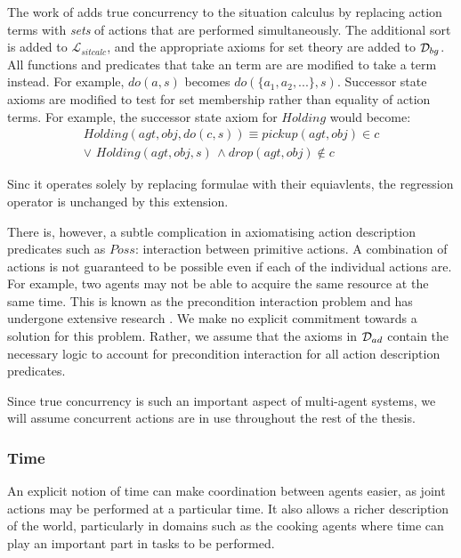The work of \citep{lin92sc_conc,reiter96sc_nat_conc} adds true concurrency
to the situation calculus by replacing action terms with \emph{sets}
of actions that are performed simultaneously. The additional sort
 is added to $\mathcal{L}_{sitcalc}$, and the appropriate
axioms for set theory are added to $\mathcal{D}_{bg}$. All functions and
predicates that take an  term are are modified to take
a  term instead. For example, $do(a,s)$ becomes
$do(\{a_{1},a_{2},...\},s)$. Successor state axioms are modified
to test for set membership rather than equality of action terms. For
example, the successor state axiom for $Holding$ would become:\begin{multline*}
Holding(agt,obj,do(c,s))\equiv pickup(agt,obj)\in c\\
\vee\,\, Holding(agt,obj,s)\,\wedge drop(agt,obj)\not\in c\end{multline*}


Sinc it operates solely by replacing formulae with their equiavlents,
the regression operator is unchanged by this extension.

There is, however, a subtle complication in axiomatising action description
predicates such as $Poss$: interaction between primitive actions.
A combination of actions is not guaranteed to be possible even if
each of the individual actions are. For example, two agents may not
be able to acquire the same resource at the same time. This is known
as the precondition interaction problem and has undergone extensive
research \citep{pinto94temporal,pinto98interacting_effects,pinto00action_interaction}.
We make no explicit commitment towards a solution for this problem.
Rather, we assume that the axioms in $\mathcal{D}_{ad}$ contain the necessary
logic to account for precondition interaction for all action description
predicates.

Since true concurrency is such an important aspect of multi-agent
systems, we will assume concurrent actions are in use throughout the
rest of the thesis.


\subsubsection{Time}

An explicit notion of time can make coordination between agents easier,
as joint actions may be performed at a particular time. It also allows
a richer description of the world, particularly in domains such as
the cooking agents where time can play an important part in tasks
to be performed.

